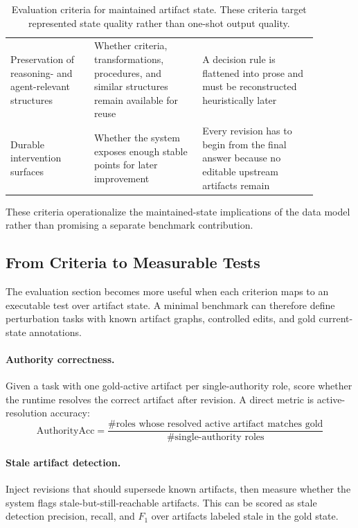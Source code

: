 \documentclass{article}
\begin{document}
\begin{table}[H]
\begin{tabular}{p{0.24\linewidth}p{0.31\linewidth}p{0.33\linewidth}}
Preservation of reasoning- and agent-relevant structures & Whether criteria, transformations, procedures, and similar structures remain available for reuse & A decision rule is flattened into prose and must be reconstructed heuristically later \\
Durable intervention surfaces & Whether the system exposes enough stable points for later improvement & Every revision has to begin from the final answer because no editable upstream artifacts remain \\
\bottomrule
\end{tabular}
\caption{Evaluation criteria for maintained artifact state. These criteria target represented state quality rather than one-shot output quality.}
\label{tab:evaluation-criteria}
\end{table}

These criteria operationalize the maintained-state implications of the data model rather than promising a separate benchmark contribution.

\subsection{From Criteria to Measurable Tests}

The evaluation section becomes more useful when each criterion maps to an executable test over artifact state. A minimal benchmark can therefore define perturbation tasks with known artifact graphs, controlled edits, and gold current-state annotations.

\paragraph{Authority correctness.} Given a task with one gold-active artifact per single-authority role, score whether the runtime resolves the correct artifact after revision. A direct metric is active-resolution accuracy:
\begin{equation}
\mathrm{AuthorityAcc} = \frac{\#\text{roles whose resolved active artifact matches gold}}{\#\text{single-authority roles}}
\end{equation}

\paragraph{Stale artifact detection.} Inject revisions that should supersede known artifacts, then measure whether the system flags stale-but-still-reachable artifacts. This can be scored as stale detection precision, recall, and $F_1$ over artifacts labeled stale in the gold state.
\end{document}
